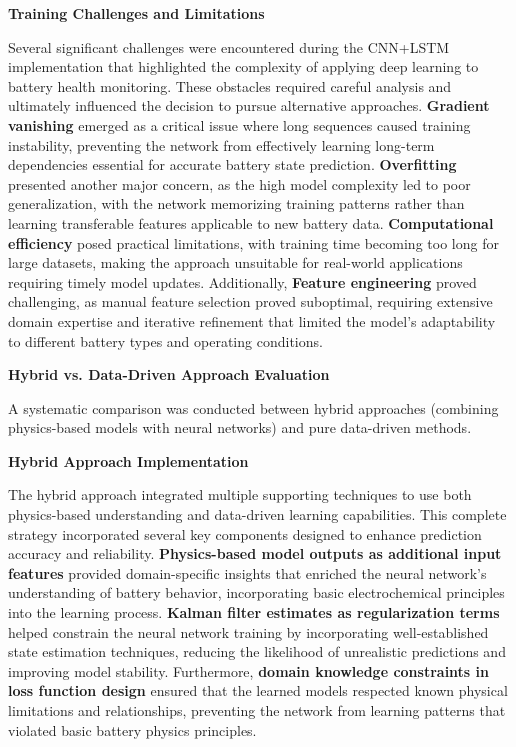 \textbf{Training Challenges and Limitations}

Several significant challenges were encountered during the CNN+LSTM implementation that highlighted the complexity of applying deep learning to battery health monitoring. These obstacles required careful analysis and ultimately influenced the decision to pursue alternative approaches. \textbf{Gradient vanishing} emerged as a critical issue where long sequences caused training instability, preventing the network from effectively learning long-term dependencies essential for accurate battery state prediction. \textbf{Overfitting} presented another major concern, as the high model complexity led to poor generalization, with the network memorizing training patterns rather than learning transferable features applicable to new battery data. \textbf{Computational efficiency} posed practical limitations, with training time becoming too long for large datasets, making the approach unsuitable for real-world applications requiring timely model updates. Additionally, \textbf{Feature engineering} proved challenging, as manual feature selection proved suboptimal, requiring extensive domain expertise and iterative refinement that limited the model's adaptability to different battery types and operating conditions.

\textbf{Hybrid vs. Data-Driven Approach Evaluation}
\label{subsec:hybrid_vs_datadriven}

A systematic comparison was conducted between hybrid approaches (combining physics-based models with neural networks) and pure data-driven methods.

\textbf{Hybrid Approach Implementation}

The hybrid approach integrated multiple supporting techniques to use both physics-based understanding and data-driven learning capabilities. This complete strategy incorporated several key components designed to enhance prediction accuracy and reliability. \textbf{Physics-based model outputs as additional input features} provided domain-specific insights that enriched the neural network's understanding of battery behavior, incorporating basic electrochemical principles into the learning process. \textbf{Kalman filter estimates as regularization terms} helped constrain the neural network training by incorporating well-established state estimation techniques, reducing the likelihood of unrealistic predictions and improving model stability. Furthermore, \textbf{domain knowledge constraints in loss function design} ensured that the learned models respected known physical limitations and relationships, preventing the network from learning patterns that violated basic battery physics principles.

